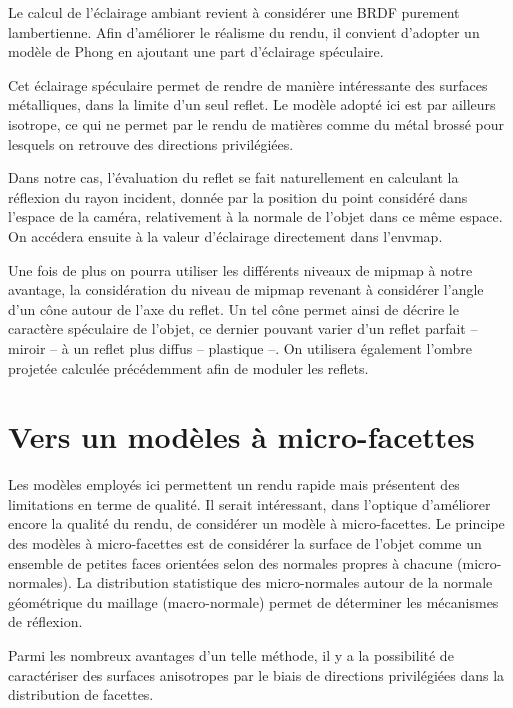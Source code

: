 \documentclass[10pt,a4paper,twoside, twocolumn]{report}
\begin{document}
Le calcul de l’éclairage ambiant revient à considérer une BRDF purement lambertienne. Afin d’améliorer le réalisme du rendu, il convient d’adopter un modèle de Phong en ajoutant une part d’éclairage spéculaire.

Cet éclairage spéculaire permet de rendre de manière intéressante des surfaces métalliques, dans la limite d’un seul reflet. Le modèle adopté ici est par ailleurs isotrope, ce qui ne permet par le rendu de matières comme du métal brossé pour lesquels on retrouve des directions privilégiées.

Dans notre cas, l’évaluation du reflet se fait naturellement en calculant la réflexion du rayon incident, donnée par la position du point considéré dans l’espace de la caméra, relativement à la normale de l’objet dans ce même espace. On accédera ensuite à la valeur d’éclairage directement dans l’envmap.

Une fois de plus on pourra utiliser les différents niveaux de mipmap à notre avantage, la considération du niveau de mipmap revenant à considérer l’angle d’un cône autour de l’axe du reflet. Un tel cône permet ainsi de décrire le caractère spéculaire de l’objet, ce dernier pouvant varier d’un reflet parfait -- miroir -- à un reflet plus diffus -- plastique --.
On utilisera également l’ombre projetée calculée précédemment afin de moduler les reflets.


\section{Vers un modèles à micro-facettes}

Les modèles employés ici permettent un rendu rapide mais présentent des limitations en terme de qualité. Il serait intéressant, dans l’optique d’améliorer encore la qualité du rendu, de considérer un modèle à micro-facettes. 
Le principe des modèles à micro-facettes est de considérer la surface de l’objet comme un ensemble de petites faces orientées selon des normales propres à chacune (micro-normales). La distribution statistique des micro-normales autour de la normale géométrique du maillage (macro-normale) permet de déterminer les mécanismes de réflexion\cite{Bruneton2010}\cite{Dupuy2012}\cite{Heitz2013}.

Parmi les nombreux avantages d’un telle méthode, il y a la possibilité de caractériser des surfaces anisotropes par le biais de directions privilégiées dans la distribution de facettes.
\end{document}
